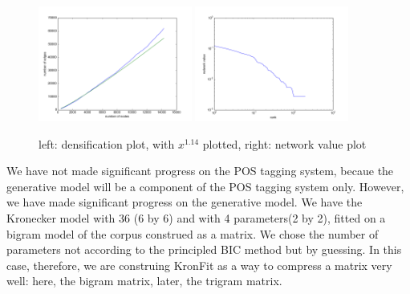\documentclass[12pt]{article}
\begin{document}
\begin{figure}
  \includegraphics[width=0.45\textwidth]{densification_plot.png}
  \includegraphics[width=0.45\textwidth]{eigenvector_loglog.png}
  \caption{left: densification plot, with $x^{1.14}$ plotted, right: network value plot}
\end{figure}

We have not made significant progress on the POS tagging system, becaue the generative model will be a component of the POS tagging system only. However, we have made significant progress on the generative model. We have the Kronecker model with 36 (6 by 6) and with 4 parameters(2 by 2), fitted on a bigram model of the corpus construed as a matrix. We chose the number of parameters not according to the principled BIC method but by guessing. In this case, therefore, we are construing KronFit as a way to compress a matrix very well: here, the bigram matrix, later, the trigram matrix.
\end{document}
